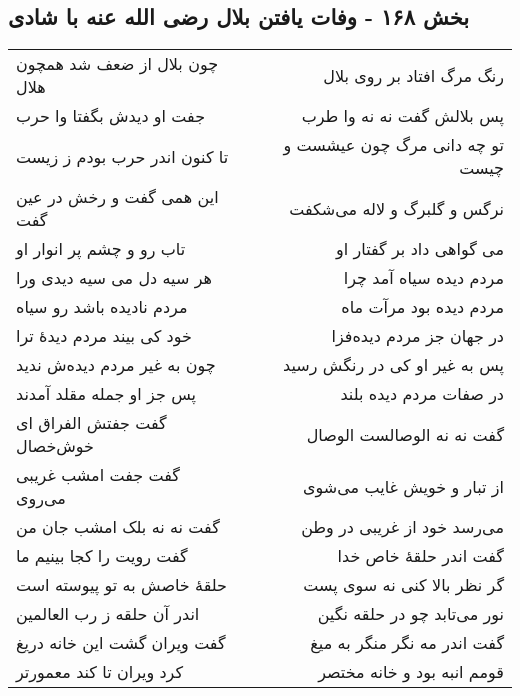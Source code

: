\begin{center}
\section*{بخش ۱۶۸ - وفات یافتن بلال رضی الله عنه با شادی}
\label{sec:sh168}
\begin{longtable}{l p{0.5cm} r}
چون بلال از ضعف شد همچون هلال
&&
رنگ مرگ افتاد بر روی بلال
\\
جفت او دیدش بگفتا وا حرب
&&
پس بلالش گفت نه نه وا طرب
\\
تا کنون اندر حرب بودم ز زیست
&&
تو چه دانی مرگ چون عیشست و چیست
\\
این همی گفت و رخش در عین گفت
&&
نرگس و گلبرگ و لاله می‌شکفت
\\
تاب رو و چشم پر انوار او
&&
می گواهی داد بر گفتار او
\\
هر سیه دل می سیه دیدی ورا
&&
مردم دیده سیاه آمد چرا
\\
مردم نادیده باشد رو سیاه
&&
مردم دیده بود مرآت ماه
\\
خود کی بیند مردم دیدهٔ ترا
&&
در جهان جز مردم دیده‌فزا
\\
چون به غیر مردم دیده‌ش ندید
&&
پس به غیر او کی در رنگش رسید
\\
پس جز او جمله مقلد آمدند
&&
در صفات مردم دیده بلند
\\
گفت جفتش الفراق ای خوش‌خصال
&&
گفت نه نه الوصالست الوصال
\\
گفت جفت امشب غریبی می‌روی
&&
از تبار و خویش غایب می‌شوی
\\
گفت نه نه بلک امشب جان من
&&
می‌رسد خود از غریبی در وطن
\\
گفت رویت را کجا بینیم ما
&&
گفت اندر حلقهٔ خاص خدا
\\
حلقهٔ خاصش به تو پیوسته است
&&
گر نظر بالا کنی نه سوی پست
\\
اندر آن حلقه ز رب العالمین
&&
نور می‌تابد چو در حلقه نگین
\\
گفت ویران گشت این خانه دریغ
&&
گفت اندر مه نگر منگر به میغ
\\
کرد ویران تا کند معمورتر
&&
قومم انبه بود و خانه مختصر
\\
\end{longtable}
\end{center}
